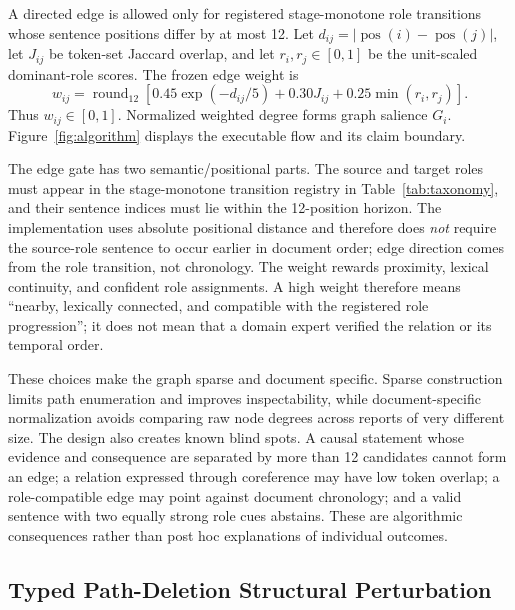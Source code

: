 \documentclass[applsci,article,submit,moreauthors]{Definitions/mdpi}
\begin{document}
A directed edge is allowed only for registered stage-monotone role transitions whose sentence positions differ by at most 12. Let $d_{ij}=|\operatorname{pos}(i)-\operatorname{pos}(j)|$, let $J_{ij}$ be token-set Jaccard overlap, and let $r_i,r_j\in[0,1]$ be the unit-scaled dominant-role scores. The frozen edge weight is
\[
w_{ij}=\operatorname{round}_{12}\!\left[0.45\exp(-d_{ij}/5)+0.30J_{ij}+0.25\min(r_i,r_j)\right].
\]
Thus $w_{ij}\in[0,1]$. Normalized weighted degree forms graph salience $G_i$. Figure~\ref{fig:algorithm} displays the executable flow and its claim boundary.

The edge gate has two semantic/positional parts. The source and target roles must appear in the stage-monotone transition registry in Table~\ref{tab:taxonomy}, and their sentence indices must lie within the 12-position horizon. The implementation uses absolute positional distance and therefore does \emph{not} require the source-role sentence to occur earlier in document order; edge direction comes from the role transition, not chronology. The weight rewards proximity, lexical continuity, and confident role assignments. A high weight therefore means ``nearby, lexically connected, and compatible with the registered role progression''; it does not mean that a domain expert verified the relation or its temporal order.

These choices make the graph sparse and document specific. Sparse construction limits path enumeration and improves inspectability, while document-specific normalization avoids comparing raw node degrees across reports of very different size. The design also creates known blind spots. A causal statement whose evidence and consequence are separated by more than 12 candidates cannot form an edge; a relation expressed through coreference may have low token overlap; a role-compatible edge may point against document chronology; and a valid sentence with two equally strong role cues abstains. These are algorithmic consequences rather than post hoc explanations of individual outcomes.

\subsection{Typed Path-Deletion Structural Perturbation}
\end{document}

